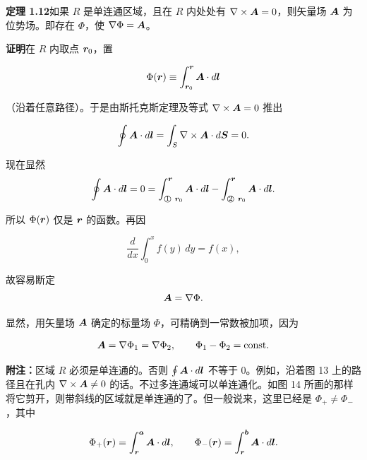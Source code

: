 \textbf{定理 1.12}\quad 如果 $R$ 是单连通区域，且在 $R$ 内处处有 $\nabla \times \bm{A} = 0$，则矢量场 $\bm{A}$ 为位势场。即存在 $\Phi$，使 $\nabla\Phi = \bm{A}$。

\textbf{证明}\quad 在 $R$ 内取点 $\bm{r}_0$，置

\begin{equation*}
\Phi(\bm{r}) \equiv \int_{\bm{r}_0}^{\bm{r}} \bm{A} \cdot d\bm{l}
\end{equation*}

（沿着任意路径）。于是由斯托克斯定理及等式 $\nabla \times \bm{A} = 0$ 推出

\begin{equation*}
\oint \bm{A} \cdot d\bm{l} = \int_{S} \nabla \times \bm{A} \cdot d\bm{S} = 0.
\end{equation*}

现在显然
\begin{equation*}
\oint \ve{A} \cdot d\ve{l} = 0 = \int_{\text{\textcircled{\scriptsize 1}}\ \ve{r}_0}^{\ve{r}} \ve{A} \cdot d\ve{l} - \int_{\text{\textcircled{\scriptsize 2}}\ \ve{r}_0}^{\ve{r}} \ve{A} \cdot d\ve{l}.
\end{equation*}

所以 $\Phi(\bm{r})$ 仅是 $\bm{r}$ 的函数。再因

\begin{equation*}
\frac{d}{dx} \int_{0}^{x} f(y)\, dy = f(x),
\end{equation*}

故容易断定
\begin{equation*}
\bm{A} = \nabla\Phi.
\end{equation*}

显然，用矢量场 $\bm{A}$ 确定的标量场 $\Phi$，可精确到一常数被加项，因为

\begin{equation*}
\bm{A} = \nabla\Phi_1 = \nabla\Phi_2, \qquad \Phi_1 - \Phi_2 = \text{const}.
\end{equation*}

\textbf{附注：}区域 $R$ 必须是单连通的。否则 $\oint \bm{A} \cdot d\bm{l}$ 不等于 0。例如，沿着图 13 上的路径且在孔内 $\nabla \times \bm{A} \neq 0$ 的话。不过多连通域可以单连通化。如图 14 所画的那样将它剪开，则带斜线的区域就是单连通的了。但一般说来，这里已经是 $\Phi_{+} \neq \Phi_{-}$，其中

\begin{equation*}
\Phi_{+}(\bm{r}) = \int_{\bm{r}}^{\bm{a}} \bm{A} \cdot d\bm{l}, \qquad \Phi_{-}(\bm{r}) = \int_{\bm{r}}^{\bm{b}} \bm{A} \cdot d\bm{l}.
\end{equation*}


